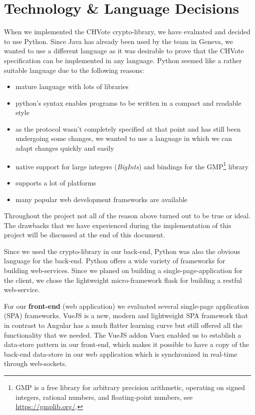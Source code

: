 \section{Technology \& Language Decisions}
When we implemented the CHVote crypto-library, we have evaluated and decided to use Python. Since Java has already been used by the team in Geneva, we wanted to use a different language as it was desirable to prove that the CHVote specification can be implemented in any language. Python seemed like a rather suitable language due to the following reasons:
\begin{itemize}	
	\item mature language with lots of libraries
	\item python's syntax enables programs to be written in a compact and readable style
	\item as the protocol wasn't completely specified at that point and has still been undergoing some changes, we wanted to use a language in which we can adapt changes quickly and easily
	\item native support for large integers (\textit{BigInts}) and bindings for the GMP\footnote{GMP is a free library for arbitrary precision arithmetic, operating on signed integers, rational numbers, and floating-point numbers, see \url{https://gmplib.org/}.} library
	\item supports a lot of platforms
	\item many popular web development frameworks are available
\end{itemize}

Throughout the project not all of the reason above turned out to be true or ideal. The drawbacks that we have experienced during the implementation of this project will be discussed at the end of this document.

Since we used the crypto-library in our back-end, Python was also the obvious language for the back-end. Python offers a wide variety of frameworks for building web-services. Since we planed on building a single-page-application for the client, we chose the lightweight micro-framework flask for building a restful web-service. 

For our \textbf{front-end} (web application) we evaluated several single-page application (SPA) frameworks. VueJS is a new, modern and lightweight SPA framework that in contrast to Angular has a much flatter learning curve but still offered all the functionality that we needed. The VueJS addon Vuex enabled us to establish a data-store pattern in our front-end, which makes it possible to have a copy of the back-end data-store in our web application which is synchronized in real-time through web-sockets.

